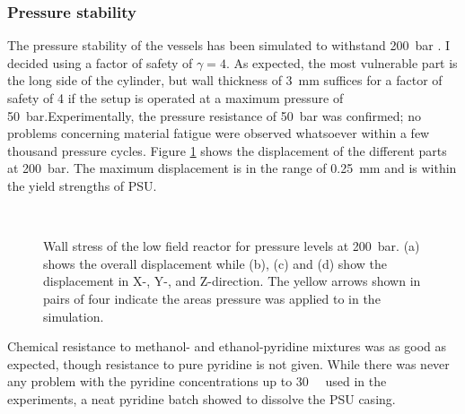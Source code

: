         \subsubsection{Pressure stability}
            The pressure stability of the vessels has been simulated to withstand \SI{200}{\bar} . I decided using a factor of safety of $\gamma = 4$. As expected, the most vulnerable part is the long side of the cylinder, but wall thickness of \SI{3}{\milli\meter} suffices for a factor of safety of 4 if the setup is operated at a maximum pressure of \SI{50}{\bar}.Experimentally, the pressure resistance of \SI{50}{\bar} was confirmed; no problems concerning material fatigue were observed whatsoever within a few thousand pressure cycles. Figure \ref{fig:results:bubblingReactorPressure} shows the displacement of the different parts at \SI{200}{\bar}. The maximum displacement is in the range of \SI{0.25}{\milli\meter} and is within the yield strengths of PSU.
            \begin{figure}
                \centering
                    \hfill
                    \\
                    \hfill
                    \caption[Reactor wall stress simulations]{Wall stress of the low field reactor for pressure levels at \SI{200}{\bar}. (a) shows the overall displacement while (b), (c) and (d) show the displacement in X-, Y-, and Z-direction.  The yellow arrows shown in pairs of four indicate the areas pressure was applied to in the simulation.}
                \label{fig:results:bubblingReactorPressure}
            \end{figure}
            Chemical resistance to methanol- and ethanol-pyridine mixtures was as good as expected, though resistance to pure pyridine is not given. While there was never any problem with the pyridine concentrations  up to \SI{30}{\micro\Molar} used in the experiments, a neat pyridine batch showed to dissolve the PSU casing.
